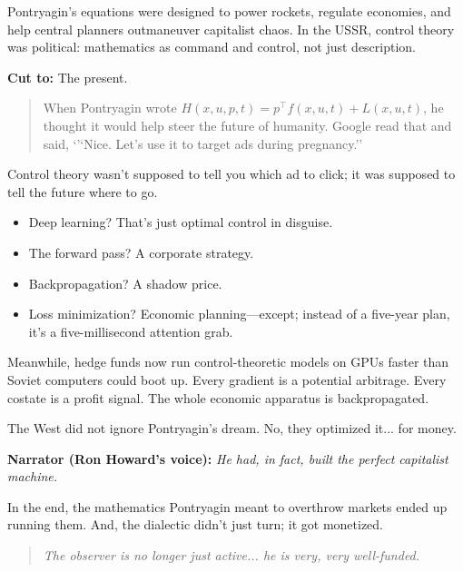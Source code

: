 Pontryagin's equations were designed to power rockets, regulate economies, and help central planners outmaneuver capitalist chaos. In the USSR, control theory was political: mathematics as command and control, not just description. 

\textbf{Cut to:} The present.

\begin{quote}
When Pontryagin wrote \( H(x, u, p, t) = p^\top f(x, u, t) + L(x, u, t) \), 
he thought it would help steer the future of humanity.  
Google read that and said, `'`Nice. Let’s use it to target ads during pregnancy.''
\end{quote}

Control theory wasn’t supposed to tell you which ad to click; it was supposed to tell the future where to go.

\begin{itemize}
  \item Deep learning? That’s just optimal control in disguise. 
  \item The forward pass? A corporate strategy. 
  \item Backpropagation? A shadow price. 
  \item Loss minimization? Economic planning—except; instead of a five-year plan, it’s a five-millisecond attention grab.
\end{itemize}

Meanwhile, hedge funds now run control-theoretic models on GPUs faster than Soviet computers could boot up. Every gradient is a potential arbitrage. Every costate is a profit signal. The whole economic apparatus is backpropagated.

The West did not ignore Pontryagin’s dream. No, they optimized it... for money.

\textbf{Narrator (Ron Howard's voice):}  
\emph{He had, in fact, built the perfect capitalist machine.}

In the end, the mathematics Pontryagin meant to overthrow markets ended up running them. And, the dialectic didn’t just turn; it got monetized.

\begin{quote}
\emph{The observer is no longer just active... he is very, very well-funded.}
\end{quote}





